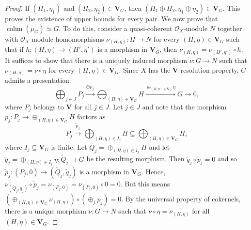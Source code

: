 \documentclass[10pt,a4paper]{amsart}
\newcommand{\Orb}{\mathcal{O}}
\newcommand{\Vect}{\mathbf{V}}
\DeclareMathOperator{\colim}{colim}
\renewcommand{\mathcal}{\mathscr}
\begin{document}
    \begin{proof}
      \renewcommand{\qedsymbol}{$\blacksquare$} If $(H_1,\eta_1)$ and
      $(H_2,\eta_2) \in \Vect_G$, then
      $(H_1\oplus H_2,\eta_1\oplus \eta_2) \in \Vect_G$. This proves
      the existence of upper bounds for every pair. We now prove that
      $\colim(\mu_G) \simeq G$. To do this, consider a quasi-coherent
      $\Orb_X$-module $N$ together with $\Orb_X$-module homomorphisms
      $\nu_{(H,\eta)} \colon H \to N$ for every $(H,\eta) \in \Vect_G$
      such that if $h\colon (H,\eta) \to (H',\eta')$ is a morphism in
      $\Vect_G$, then $\nu_{(H,\eta)} = \nu_{(H',\eta')} \circ h$. It
      suffices to show that there is a uniquely induced morphism
      $\nu \colon G \to N$ such that $\nu_{(H,\eta)} = \nu \circ \eta$
      for every $(H,\eta) \in \Vect_G$. Since $X$ has the $\Vect$-resolution
      property, $G$ admits a presentation:
      \[
        \bigoplus_{j\in J} P_j \xrightarrow{\oplus p_j}
          \bigoplus_{(H,\eta)\in \Vect_G} H \xrightarrow{\oplus_{(H,\eta)\in\Vect_G} \eta} G \to 0,
      \]
      where $P_j$ belongs to $\Vect$ for all $j\in J$. Let
      $j\in J$ and note that the morphism
      $p_j \colon P_j \to \oplus_{(H,\eta)\in \Vect_G} H$ factors as
      \[
        P_j \xrightarrow{\tilde{p}_j} \bigoplus_{(H,\eta)\in I_j} H
        \subseteq \bigoplus_{(H,\eta)\in \Vect_G} H,
      \]
      where $I_j \subseteq \Vect_G$ is finite. Let
      $\tilde{Q}_j = \oplus_{(H,\eta)\in I_j} H$ and let
      $\tilde{q}_j = \oplus_{(H,\eta) \in I_j} \eta \colon \tilde{Q}_j \to G$ be the
      resulting morphism. Then $\tilde{q}_j\circ \tilde{p}_j = 0$ and
      so $\tilde{p}_j\colon (P_j,0) \to (\tilde{Q}_j,\tilde{q}_j)$ is a morphism
      in $\Vect_G$. Hence, $\nu_{(\tilde{Q}_j,\tilde{q}_j)} \circ \tilde{p}_j=\nu_{(P_j,0)}=\nu_{(P_j,0)} \circ 0=0$. But this means $(\oplus_{(H,\eta) \in \Vect_G} \nu_{(H,\eta)}) \circ (\oplus_j {p}_j) = 0$. By the universal property of cokernels, there is a unique
      morphism $\nu \colon G \to N$ such that
      $\nu \circ \eta = \nu_{(H,\eta)}$ for all $(H,\eta)\in \Vect_G$. 
  \end{proof}
\end{document}

